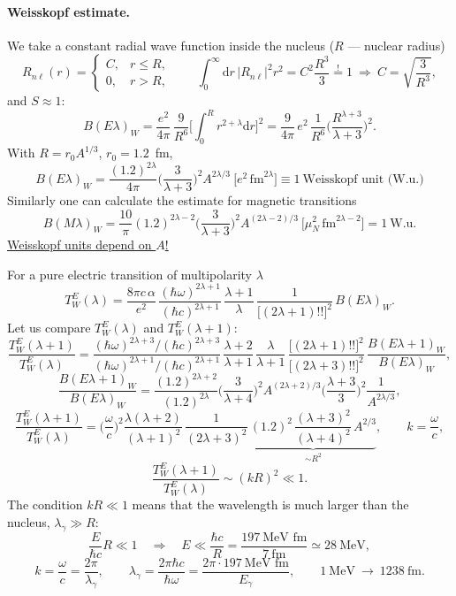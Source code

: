 \documentclass[11pt,a4paper]{article}
\newcommand{\ud}{\mathrm{d}}
\begin{document}
\paragraph{Weisskopf estimate.} We take a constant radial wave function inside the nucleus ($R$ --- nuclear radius)
\[
R_{n\ell}(r)=\begin{cases}C, & r\le R,\\ 0, & r>R,\end{cases}
\qquad
\int_0^\infty\ud r\,|R_{n\ell}|^2r^2=C^2\frac{R^3}{3}\overset{!}{=}1\ \Rightarrow\ C=\sqrt{\frac{3}{R^3}},
\]
and $S\approx1$:
\[
B(E\lambda)_W=\frac{e^2}{4\pi}\,\frac{9}{R^6}\Big[\int_0^Rr^{2+\lambda}\ud r\Big]^2=\frac{9}{4\pi}\,e^2\,\frac{1}{R^6}\Big(\frac{R^{\lambda+3}}{\lambda+3}\Big)^2 .
\]
With $R=r_0A^{1/3}$, $r_0=1.2$~fm,
\[
B(E\lambda)_W=\frac{(1.2)^{2\lambda}}{4\pi}\Big(\frac{3}{\lambda+3}\Big)^2A^{2\lambda/3}\ \big[e^2\,\text{fm}^{2\lambda}\big]\equiv1\ \text{Weisskopf unit (W.u.)}
\]
Similarly one can calculate the estimate for magnetic transitions
\[
B(M\lambda)_W=\frac{10}{\pi}(1.2)^{2\lambda-2}\Big(\frac{3}{\lambda+3}\Big)^2A^{(2\lambda-2)/3}\ \big[\mu_N^2\,\text{fm}^{2\lambda-2}\big]=1\ \text{W.u.}
\]
\underline{Weisskopf units depend on $A$!}

For a pure electric transition of multipolarity $\lambda$
\[
T^E_W(\lambda)=\frac{8\pi c\,\alpha}{e^2}\,\frac{(\hbar\omega)^{2\lambda+1}}{(\hbar c)^{2\lambda+1}}\,\frac{\lambda+1}{\lambda}\,\frac{1}{\big[(2\lambda+1)!!\big]^2}\,B(E\lambda)_W .
\]
Let us compare $T^E_W(\lambda)$ and $T^E_W(\lambda+1)$:
\[
\frac{T^E_W(\lambda+1)}{T^E_W(\lambda)}=\frac{(\hbar\omega)^{2\lambda+3}/(\hbar c)^{2\lambda+3}}{(\hbar\omega)^{2\lambda+1}/(\hbar c)^{2\lambda+1}}\,\frac{\lambda+2}{\lambda+1}\,\frac{\lambda}{\lambda+1}\,\frac{\big[(2\lambda+1)!!\big]^2}{\big[(2\lambda+3)!!\big]^2}\,\frac{B(E\lambda{+}1)_W}{B(E\lambda)_W},
\]
\[
\frac{B(E\lambda{+}1)_W}{B(E\lambda)_W}=\frac{(1.2)^{2\lambda+2}}{(1.2)^{2\lambda}}\Big(\frac{3}{\lambda+4}\Big)^2A^{(2\lambda+2)/3}\Big(\frac{\lambda+3}{3}\Big)^2\frac{1}{A^{2\lambda/3}},
\]
\[
\frac{T^E_W(\lambda+1)}{T^E_W(\lambda)}=\Big(\frac\omega c\Big)^2\frac{\lambda(\lambda+2)}{(\lambda+1)^2}\,\frac{1}{(2\lambda+3)^2}\,
\underbrace{(1.2)^2\,\frac{(\lambda+3)^2}{(\lambda+4)^2}\,A^{2/3}}_{\sim R^2},
\qquad k=\frac\omega c ,
\]
\[
\frac{T^E_W(\lambda+1)}{T^E_W(\lambda)}\sim(kR)^2\ll1 .
\]
The condition $kR\ll1$ means that the wavelength is much larger than the nucleus, $\lambda_\gamma\gg R$:
\[
\frac{E}{\hbar c}R\ll1\quad\Rightarrow\quad E\ll\frac{\hbar c}{R}=\frac{197\ \text{MeV fm}}{7\ \text{fm}}\simeq28\ \text{MeV},
\]
\[
k=\frac\omega c=\frac{2\pi}{\lambda_\gamma},\qquad \lambda_\gamma=\frac{2\pi\hbar c}{\hbar\omega}=\frac{2\pi\cdot197\ \text{MeV fm}}{E_\gamma},
\qquad 1\ \text{MeV}\ \to\ 1238\ \text{fm}.
\]
\end{document}
